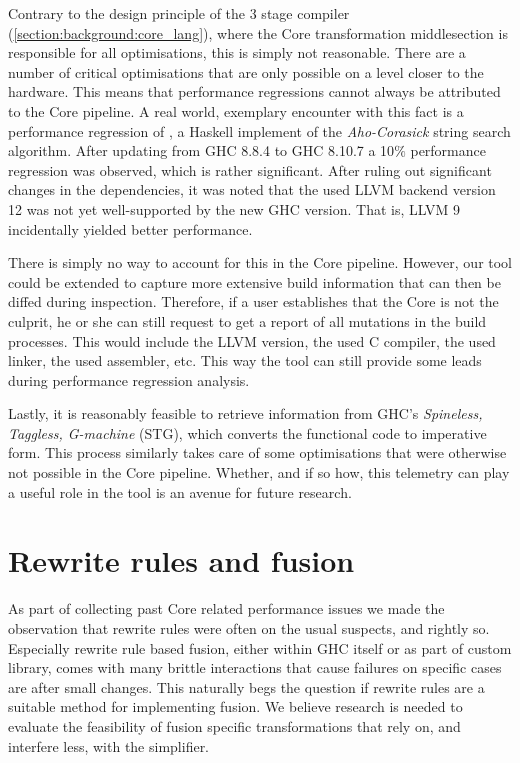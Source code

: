 Contrary to the design principle of the 3 stage compiler (\cref{section:background:core_lang}), where the Core transformation middlesection
is responsible for all optimisations, this is simply not reasonable. There are a number of critical optimisations that are only possible on
a level closer to the hardware. This means that performance regressions cannot always be attributed to the Core pipeline. A real world, exemplary
encounter with this fact is a performance regression of  \cite{alfred-margaret}, a Haskell implement of the \textit {Aho-Corasick}
string search algorithm. After updating from GHC 8.8.4 to GHC 8.10.7 a 10$\%$ performance regression was observed, which is rather significant.
After ruling out significant changes in the dependencies, it was noted that the used LLVM backend version 12 was not yet well-supported by the new GHC
version. That is, LLVM 9 incidentally yielded better performance.

There is simply no way to account for this in the Core pipeline. However, our tool could be extended to capture more extensive build information that
can then be diffed during inspection. Therefore, if a user establishes that the Core is not the culprit, he or she can still request to get a report of
all mutations in the build processes. This would include the LLVM version, the used C compiler, the used linker, the used assembler, etc. 
This way the tool can still provide some leads during performance regression analysis.

Lastly, it is reasonably feasible to retrieve information from GHC's \textit{Spineless, Taggless, G-machine} (STG), which converts the functional code
to imperative form. This process similarly takes care of some optimisations that were otherwise not possible in the Core pipeline. Whether, and if so how, 
this telemetry can play a useful role in the tool is an avenue for future research.

\section{Rewrite rules and fusion}

As part of collecting past Core related performance issues we made the observation that rewrite rules were often on the usual suspects, and rightly so.
Especially rewrite rule based fusion, either within GHC itself or as part of custom library, comes with many brittle interactions that cause failures
on specific cases are after small changes. This naturally begs the question if rewrite rules are a suitable method for implementing fusion. We believe
research is needed to evaluate the feasibility of fusion specific transformations that rely on, and interfere less, with the simplifier.
